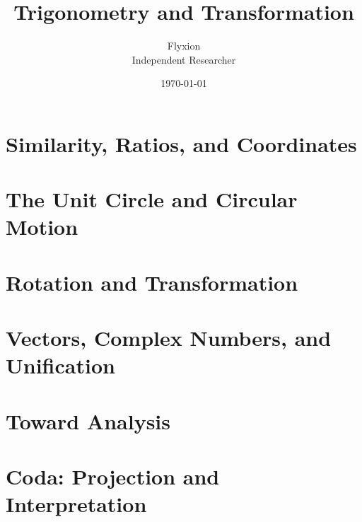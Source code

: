 \documentclass[11pt,twoside]{book}
\title{Trigonometry and Transformation}
\author{Flyxion\\\small Independent Researcher}
\date{\today}
\theoremstyle{plain}
\theoremstyle{definition}
\theoremstyle{remark}
\begin{document}
\frontmatter
\maketitle


\tableofcontents

\mainmatter

\setcounter{chapter}{-1}


\part{Similarity, Ratios, and Coordinates}




\part{The Unit Circle and Circular Motion}





\part{Rotation and Transformation}





\part{Vectors, Complex Numbers, and Unification}






\part{Toward Analysis}




\part{Coda: Projection and Interpretation}

\end{document}
